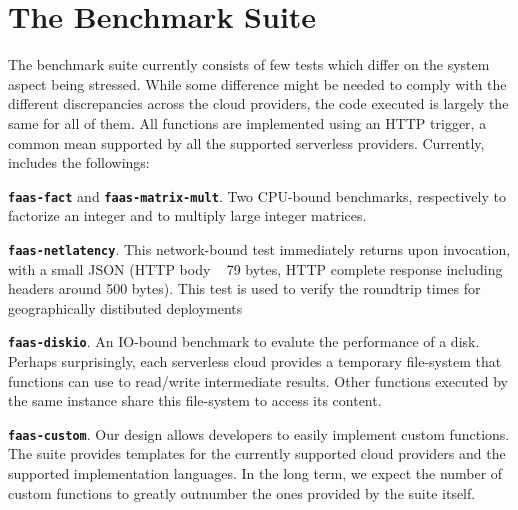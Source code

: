 \section{The \sys Benchmark Suite}\label{sec:tests}
The \sys benchmark suite currently consists of few tests which differ on the system aspect being stressed.
While some difference might be needed to comply with the different discrepancies across the cloud providers, the code executed is largely the same for all of them.
All functions are implemented using an \gls{HTTP} trigger, a common mean supported by all the supported serverless providers.
Currently, \sys includes the followings:

\textbf{\texttt{faas-fact}} and \textbf{\texttt{faas-matrix-mult}}. 
Two CPU-bound benchmarks, respectively to factorize an integer and to multiply large integer matrices.

\textbf{\texttt{faas-netlatency}}. This network-bound test immediately returns upon invocation, with a small \gls{JSON} (HTTP body ~ 79 bytes, HTTP complete response including headers around 500 bytes). This test is used to verify the roundtrip times for geographically distibuted deployments

\textbf{\texttt{faas-diskio}}. An IO-bound benchmark to evalute the performance of a disk. 
Perhaps surprisingly, each serverless cloud provides a temporary file-system that functions can use to read/write intermediate results. 
Other functions executed by the same instance share this file-system to access its content.

\textbf{\texttt{faas-custom}}. Our design allows developers to easily implement custom functions. 
The suite provides templates for the currently supported cloud providers and the supported implementation languages. 
In the long term, we expect the number of custom functions to greatly outnumber the ones provided by the suite itself.

